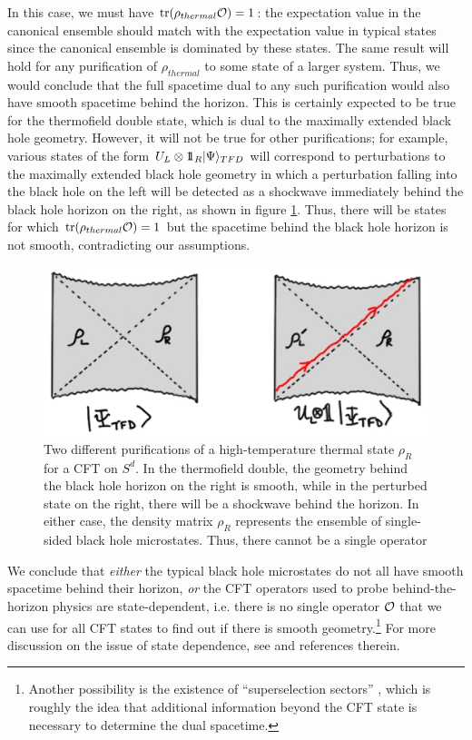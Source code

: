 \documentclass[12pt,epsf]{article}
\newcommand{\tr}{\operatorname{tr}}
\def\identity{{\rlap{1} \hskip 1.6pt \hbox{1}}}
\begin{document}
In this case, we must have $\tr(\rho_{thermal} {\cal O})= 1$: the expectation value in the canonical ensemble should match with the expectation value in typical states since the canonical ensemble is dominated by these states. The same result will hold for any purification of $\rho_{thermal}$ to some state of a larger system. Thus, we would conclude that the full spacetime dual to any such purification would also have smooth spacetime behind the horizon. This is certainly expected to be true for the thermofield double state, which is dual to the maximally extended black hole geometry. However, it will not be true for other purifications; for example, various states of the form $U_L \otimes \identity_R |\Psi \rangle_{TFD}$ will correspond to perturbations to the maximally extended black hole geometry in which a perturbation falling into the black hole on the left will be detected as a shockwave immediately behind the black hole horizon on the right, as shown in figure \ref{firewall}. Thus, there will be states for which $\tr(\rho_{thermal} {\cal O})= 1$ but the spacetime behind the black hole horizon is not smooth, contradicting our assumptions.

\begin{figure}
\centering
\includegraphics[width = 0.7 \textwidth]{firewall.eps}
\caption{Two different purifications of a high-temperature thermal state $\rho_R$ for a CFT on $S^d$. In the thermofield double, the geometry behind the black hole horizon on the right is smooth, while in the perturbed state on the right, there will be a shockwave behind the horizon. In either case, the density matrix $\rho_R$ represents the ensemble of single-sided black hole microstates. Thus, there cannot be a single operator}
\label{firewall}
\end{figure}

We conclude that {\it either} the typical black hole microstates do not all have smooth spacetime behind their horizon, {\it or} the CFT operators used to probe behind-the-horizon physics are state-dependent, i.e. there is no single operator ${\cal O}$ that we can use for all CFT states to find out if there is smooth geometry.\footnote{Another possibility is the existence of ``superselection sectors'' \cite{Marolf:2012xe}, which is roughly the idea that additional information beyond the CFT state is necessary to determine the dual spacetime.} For more discussion on the issue of state dependence, see \cite{Papadodimas:2015jra} and references therein.
\end{document}
